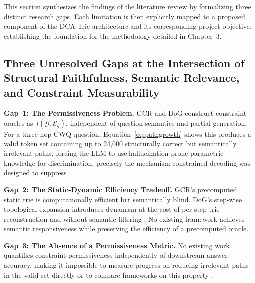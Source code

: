 This section synthesizes the findings of the literature review by formalizing three distinct research gaps. Each limitation is then explicitly mapped to a proposed component of the DCA-Trie architecture and its corresponding project objective, establishing the foundation for the methodology detailed in Chapter~3.

\subsection{Three Unresolved Gaps at the Intersection of Structural Faithfulness, Semantic Relevance, and Constraint Measurability}

\textbf{Gap~1: The Permissiveness Problem.} GCR and DoG construct constraint oracles as $f(\mathcal{G}, \mathcal{E}_q)$, independent of question semantics and partial generation. For a three-hop CWQ question, Equation~\eqref{eq:pathgrowth} shows this produces a valid token set containing up to 24,000 structurally correct but semantically irrelevant paths, forcing the LLM to use hallucination-prone parametric knowledge for discrimination, precisely the mechanism constrained decoding was designed to suppress \citep{luo2024gcr,li2024dog}.

\textbf{Gap~2: The Static-Dynamic Efficiency Tradeoff.} GCR's precomputed
static trie is computationally efficient but semantically blind. DoG's step-wise
topological expansion introduces dynamism at the cost of per-step trie
reconstruction and without semantic filtering \citep{li2024dog,
    willard2023outlines}. No existing framework achieves semantic responsiveness
while preserving the efficiency of a precomputed oracle.

\textbf{Gap~3: The Absence of a Permissiveness Metric.} No existing work
quantifies constraint permissiveness independently of downstream answer accuracy,
making it impossible to measure progress on reducing irrelevant paths in the valid
set directly or to compare frameworks on this property \citep{luo2024gcr,
    li2024dog}.

